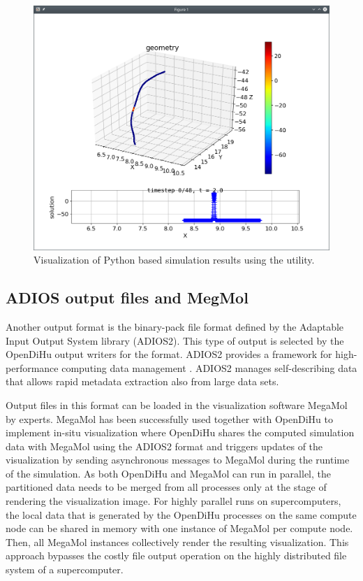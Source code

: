 \begin{figure}%
  \centering%
  \includegraphics[width=\textwidth]{images/implementation/python_output.png}%
  \caption{Visualization of Python based simulation results using the  utility.}%
  \label{fig:python_output}%
\end{figure}%

\subsection{ADIOS output files and MegMol}
Another output format is the binary-pack file format defined by the Adaptable Input Output System library (ADIOS2). This type of output is selected by the OpenDiHu output writers for the  format. ADIOS2 provides a framework for high-performance computing data management \cite{adios2}. ADIOS2 manages self-describing data that allows rapid metadata extraction also from large data sets.

Output files in this format can be loaded in the visualization software MegaMol by experts. MegaMol has been successfully used together with OpenDiHu to implement in-situ visualization where OpenDiHu shares the computed simulation data with MegaMol using the ADIOS2 format and triggers updates of the visualization by sending asynchronous messages to MegaMol during the runtime of the simulation. As both OpenDiHu and MegaMol can run in parallel, the partitioned data needs to be merged from all processes only at the stage of rendering the visualization image. For highly parallel runs on supercomputers, the local data that is generated by the OpenDiHu processes on the same compute node can be shared in memory with one instance of MegaMol per compute node. Then, all MegaMol instances collectively render the resulting visualization. This approach bypasses the costly file output operation on the highly distributed file system of a supercomputer.

